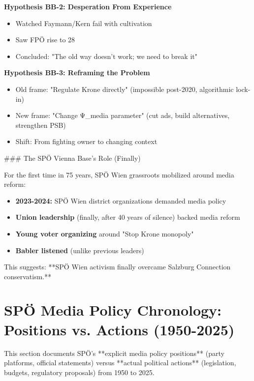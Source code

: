 \textbf{Hypothesis BB-2: Desperation From Experience}
\begin{itemize}
\item Watched Faymann/Kern fail with cultivation
\item Saw FPÖ rise to 28%
\item Concluded: "The old way doesn't work; we need to break it"
\end{itemize}

\textbf{Hypothesis BB-3: Reframing the Problem}
\begin{itemize}
\item Old frame: "Regulate Krone directly" (impossible post-2020, algorithmic lock-in)
\item New frame: "Change Ψ_media parameter" (cut ads, build alternatives, strengthen PSB)
\item Shift: From fighting owner to changing context
\end{itemize}

### The SPÖ Vienna Base's Role (Finally)

For the first time in 75 years, SPÖ Wien grassroots mobilized around media reform:

\begin{itemize}
\item \textbf{2023-2024:} SPÖ Wien district organizations demanded media policy
\item \textbf{Union leadership} (finally, after 40 years of silence) backed media reform
\item \textbf{Young voter organizing} around "Stop Krone monopoly"
\item \textbf{Babler listened} (unlike previous leaders)
\end{itemize}

This suggests: **SPÖ Wien activism finally overcame Salzburg Connection conservatism.**


\section*{SPÖ Media Policy Chronology: Positions vs. Actions (1950-2025)}

This section documents SPÖ's **explicit media policy positions** (party platforms, official statements)
versus **actual political actions** (legislation, budgets, regulatory proposals) from 1950 to 2025.

